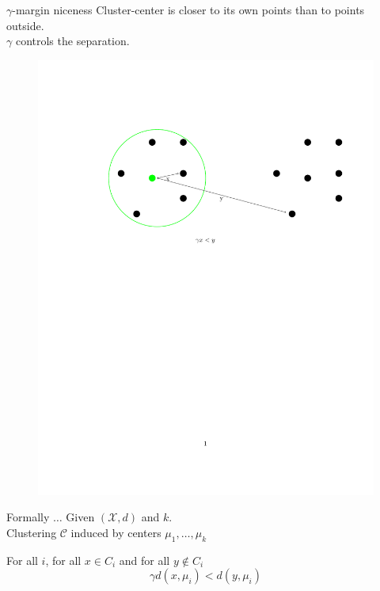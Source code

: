 \documentclass{beamer}
\newcommand{\mc}{\mathcal}
\begin{document}
\begin{frame}{$\gamma$-margin niceness}
	Cluster-center is closer to its own points than to points outside.\\
	\vspace{1cm}$\gamma$ controls the separation.
	\vspace{1cm}\begin{figure}        
            \centering\includegraphics[trim= 400 470 400 150, scale=0.5]{figures/gammaMargin.pdf}
    \end{figure}  
\end{frame}

\begin{frame}{Formally $\ldots$}
	Given $(\mc X, d)$ and $k$.\\
	\vspace{0.4cm}Clustering $\mc C$ induced by centers $\mu_1, \ldots, \mu_k$\\
	
	\vspace{1cm}\begin{block}{}
		For all $i$, for all $x \in C_i$ and for all $y \not\in C_i$
		$$\gamma d(x, \mu_i) < d(y, \mu_i)$$	
	\end{block}  
\end{frame}
\end{document}
